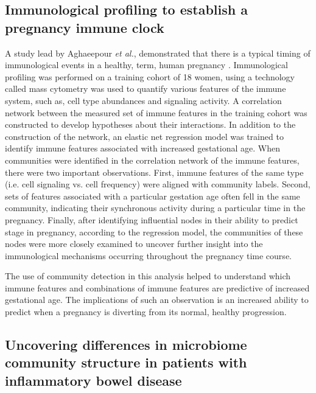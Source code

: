 \subsection{Immunological profiling to establish a pregnancy immune clock}
A study lead by Aghaeepour \emph{et al.}, demonstrated that there is a typical timing of immunological events in a healthy, term, human pregnancy \cite{immuneClock}. Immunological profiling was performed on a training cohort of 18 women, using a technology called mass cytometry \cite{cytof} was used to quantify various features of the immune system, such as, cell type abundances and signaling activity. A correlation network between the measured set of immune features in the training cohort was constructed to develop hypotheses about their interactions. In addition to the construction of the network, an elastic net regression model \cite{eNet} was trained to identify immune features associated with increased gestational age. When communities were identified in the correlation network of the immune features, there were two important observations. First, immune features of the same type (i.e. cell signaling vs. cell frequency) were aligned with community labels. Second, sets of features associated with a particular gestation age often fell in the same community, indicating their synchronous activity during a particular time in the pregnancy. Finally, after identifying influential nodes in their ability to predict stage in pregnancy, according to the regression model, the communities of these nodes were more closely examined to uncover further insight into the immunological mechanisms occurring throughout the pregnancy time course. 

The use of community detection in this analysis helped to understand which immune features and combinations of immune features are predictive of increased gestational age. The implications of such an observation is an increased ability to predict when a pregnancy is diverting from its normal, healthy progression. 

\subsection{Uncovering differences in microbiome community structure in patients with inflammatory bowel disease}

